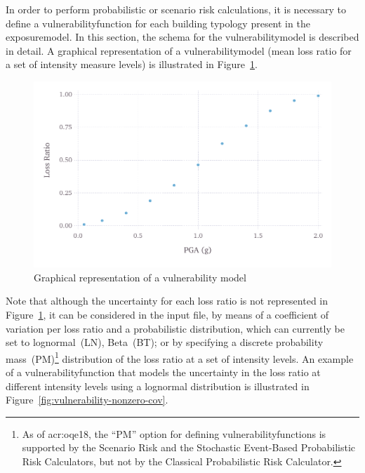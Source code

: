In order to perform probabilistic or scenario risk calculations, it is
necessary to define a \gls{vulnerabilityfunction} for each building typology
present in the \gls{exposuremodel}. In this section, the schema for the
\gls{vulnerabilitymodel} is described in detail. A graphical representation of
a \gls{vulnerabilitymodel} (mean loss ratio for a set of intensity measure
levels) is illustrated in Figure~\ref{fig:vulnerability-zero-cov}.

\begin{figure}[ht]
\centering
\includegraphics[width=12cm]{figures/risk/vulnerability-zero-cov.pdf}
\caption{Graphical representation of a vulnerability model}
\label{fig:vulnerability-zero-cov}
\end{figure}


Note that although the uncertainty for each loss ratio is not represented in
Figure~\ref{fig:vulnerability-zero-cov}, it can be considered in the input
file, by means of a coefficient of variation per loss ratio and a
probabilistic distribution, which can currently be set to lognormal~(LN),
Beta~(BT); or by specifying a discrete probability mass~(PM)\footnote{As of
\glsdesc{acr:oqe18}, the ``PM'' option for defining
\glspl{vulnerabilityfunction} is supported by the Scenario Risk and the
Stochastic Event-Based Probabilistic Risk Calculators, but not by the
Classical Probabilistic Risk Calculator.} distribution of the loss ratio at a
set of intensity levels. An example of a \gls{vulnerabilityfunction} that
models the uncertainty in the loss ratio at different intensity levels using a
lognormal distribution is illustrated in 
Figure~\ref{fig:vulnerability-nonzero-cov}.

